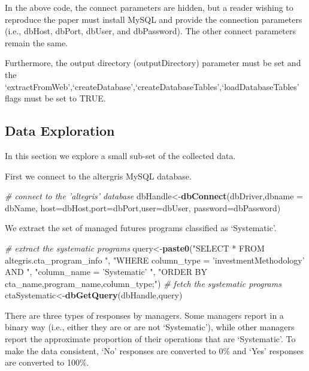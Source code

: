 \documentclass[]{article}
\newenvironment{Shaded}{\begin{snugshade}}{\end{snugshade}}
\newcommand{\KeywordTok}[1]{\textcolor[rgb]{0.13,0.29,0.53}{\textbf{{#1}}}}
\newcommand{\DataTypeTok}[1]{\textcolor[rgb]{0.13,0.29,0.53}{{#1}}}
\newcommand{\StringTok}[1]{\textcolor[rgb]{0.31,0.60,0.02}{{#1}}}
\newcommand{\CommentTok}[1]{\textcolor[rgb]{0.56,0.35,0.01}{\textit{{#1}}}}
\newcommand{\NormalTok}[1]{{#1}}
\begin{document}
In the above code, the connect parameters are hidden, but a reader
wishing to reproduce the paper must install MySQL and provide the
connection parameters (i.e., dbHost, dbPort, dbUser, and dbPassword).
The other connect parameters remain the same.

Furthermore, the output directory (outputDirectory) parameter must be
set and the
`extractFromWeb',`createDatabase',`createDatabaseTables',`loadDatabaseTables'
flags must be set to TRUE.

\subsection{Data Exploration}\label{data-exploration}

In this section we explore a small sub-set of the collected data.

First we connect to the altergris MySQL database.

\begin{Shaded}
\begin{Highlighting}[]
\CommentTok{# connect to the 'altegris' database}
\NormalTok{dbHandle<-}\KeywordTok{dbConnect}\NormalTok{(dbDriver,}\DataTypeTok{dbname =} \NormalTok{dbName,}
  \DataTypeTok{host=}\NormalTok{dbHost,}\DataTypeTok{port=}\NormalTok{dbPort,}\DataTypeTok{user=}\NormalTok{dbUser, }
  \DataTypeTok{password=}\NormalTok{dbPassword)}
\end{Highlighting}
\end{Shaded}

We extract the set of managed futures programs classified as
`Systematic'.

\begin{Shaded}
\begin{Highlighting}[]
\CommentTok{# extract the systematic programs}
\NormalTok{query<-}\KeywordTok{paste0}\NormalTok{(}\StringTok{"SELECT * FROM altegris.cta_program_info "}\NormalTok{,}
  \StringTok{"WHERE column_type = 'investmentMethodology' AND "}\NormalTok{,}
  \StringTok{"column_name = 'Systematic' "}\NormalTok{,}
  \StringTok{"ORDER BY cta_name,program_name,column_type;"}\NormalTok{)}
\CommentTok{# fetch the systematic programs}
\NormalTok{ctaSystematic<-}\KeywordTok{dbGetQuery}\NormalTok{(dbHandle,query)}
\end{Highlighting}
\end{Shaded}

There are three types of responses by managers. Some managers report in
a binary way (i.e., either they are or are not `Systematic'), while
other managers report the approximate proportion of their operations
that are `Systematic'. To make the data consistent, `No' responses are
converted to 0\% and `Yes' responses are converted to 100\%.
\end{document}
